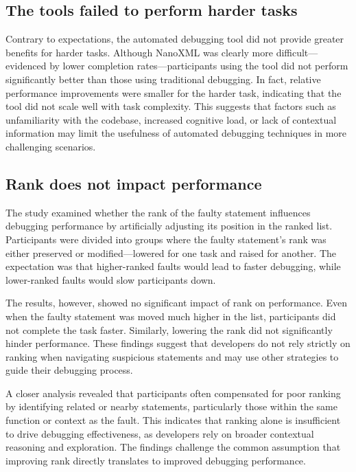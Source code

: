 \subsection{The tools failed to perform harder tasks}

Contrary to expectations, the automated debugging tool did not provide greater benefits for harder tasks. Although NanoXML was clearly more difficult—evidenced by lower completion rates—participants using the tool did not perform significantly better than those using traditional debugging. In fact, relative performance improvements were smaller for the harder task, indicating that the tool did not scale well with task complexity. This suggests that factors such as unfamiliarity with the codebase, increased cognitive load, or lack of contextual information may limit the usefulness of automated debugging techniques in more challenging scenarios.


\subsection{Rank does not impact performance}

The study examined whether the rank of the faulty statement influences debugging performance by artificially adjusting its position in the ranked list. Participants were divided into groups where the faulty statement’s rank was either preserved or modified—lowered for one task and raised for another. The expectation was that higher-ranked faults would lead to faster debugging, while lower-ranked faults would slow participants down.


The results, however, showed no significant impact of rank on performance. Even when the faulty statement was moved much higher in the list, participants did not complete the task faster. Similarly, lowering the rank did not significantly hinder performance. These findings suggest that developers do not rely strictly on ranking when navigating suspicious statements and may use other strategies to guide their debugging process.


A closer analysis revealed that participants often compensated for poor ranking by identifying related or nearby statements, particularly those within the same function or context as the fault. This indicates that ranking alone is insufficient to drive debugging effectiveness, as developers rely on broader contextual reasoning and exploration. The findings challenge the common assumption that improving rank directly translates to improved debugging performance.

